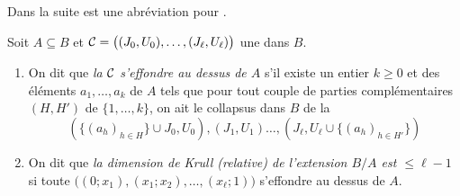 Dans la suite  est une abréviation pour .
\begin{definition}{\rm  
\label{defColRel} 
Soit $A\subseteq B$ et 
${\cal C}=\big((J_0,U_0),\ldots,(J_\ell,U_\ell)\big)$ une \proc dans $B$. 
\begin{enumerate}
\item On dit que {\em la \proc ${\cal C}$ s'effondre au dessus de $A$} s'il 
existe un entier $k\geq 0$ et des éléments $a_1,\ldots,a_k$ de $A$ tels que  pour tout couple de parties 
complémentaires $(H,H')$ de $\{1,\ldots,k\}$, 
on ait le collapsus dans $B$ de la \proc
\begin{equation} \label {eqdefColRel}
(\{(a_h)_{h\in H}\}\cup J_0,U_0),(J_1,U_1)\ldots,(J_\ell,U_\ell\cup 
\{(a_h)_{h\in H'}\})
\end{equation}
\item On dit que {\em la dimension de Krull (relative) de l'extension 
$B/A$ est $\leq  \ell-1$} si toute \proel  
$\big((0;x_1),(x_1;x_2),\ldots,(x_\ell;1)\big)$ s'effondre au dessus de $A$.
\end{enumerate}
}
\end{definition}

